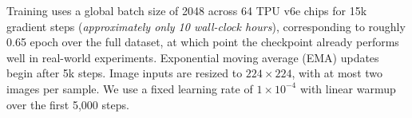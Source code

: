 Training uses a global batch size of 2048 across 64 TPU v6e chips for 15k gradient steps (\emph{approximately only 10 wall-clock hours}), corresponding to roughly 0.65 epoch over the full dataset, at which point the checkpoint already performs well in real-world experiments. Exponential moving average (EMA) updates begin after 5k steps.
Image inputs are resized to $224 \times 224$, with at most two images per sample. We use a fixed learning rate of $1 \times 10^{-4}$ with linear warmup over the first 5,000 steps.

